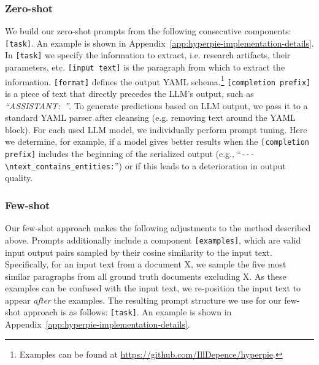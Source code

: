 \subsubsection{Zero-shot} We build our zero-shot prompts from the following consecutive components: \texttt{[task]\allowbreak[format]}.
An example is shown in Appendix~\ref{app:hyperpie-implementation-details}.
In \texttt{[task]} we specify the information to extract, i.e. research artifacts, their parameters, etc. \texttt{[input text]} is the paragraph from which to extract the information. \texttt{[format]} defines the output YAML schema.\footnote{Examples can be found at \url{https://github.com/IllDepence/hyperpie}.} \texttt{[completion prefix]} is a piece of text that directly precedes the LLM's output, such as \textit{``ASSISTANT:~''}.
%
%
To generate predictions based on LLM output, we pass it to a standard YAML parser after cleansing (e.g. removing text around the YAML block).
%
%
For each used LLM model, we individually perform prompt tuning. Here we determine, for example, if a model gives better results when the \texttt{[completion prefix]} includes the beginning of the serialized output (e.g., ``\texttt{-{}-{}-\allowbreak\textbackslash n\allowbreak text\_\allowbreak contains\_\allowbreak entities:}'') or if this leads to a deterioration in output quality.

\subsubsection{Few-shot} Our few-shot approach makes the following adjustments to the method described above. Prompts additionally include a component \texttt{[examples]}, which are valid input output pairs sampled by their cosine similarity to the input text. Specifically, for an input text from a document X, we sample the five most similar paragraphs from all ground truth documents excluding X. As these examples can be confused with the input text, we re-position the input text to appear \emph{after} the examples. The resulting prompt structure we use for our few-shot approach is as follows: \texttt{[task]\allowbreak[format]\allowbreak[examples]}.
An example is shown in Appendix~\ref{app:hyperpie-implementation-details}.

